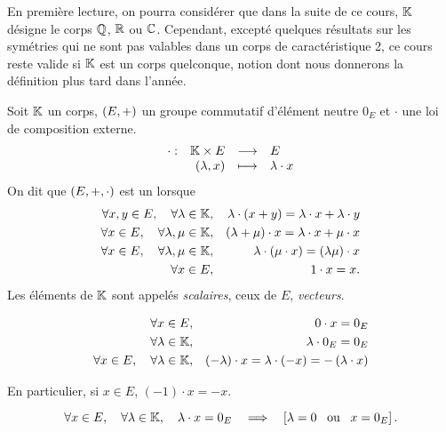 \documentclass{magnolia}
\begin{document}
En première lecture, on pourra considérer que dans la suite de ce cours, $\mathbb{K}$ désigne le corps $\mathbb{Q}$, $\mathbb{R}$ ou
$\mathbb{C}$. Cependant, excepté quelques résultats sur les symétries qui ne sont pas valables dans
un corps de caractéristique 2, ce cours reste valide si $\mathbb{K}$ est un corps quelconque, notion
dont nous donnerons la définition plus tard dans l'année.
\vspace{2ex}

\begin{definition}[utile=-3]
Soit $\mathbb{K}$ un corps, $\left(E,+\right)$ un groupe commutatif d'élément neutre $0_E$ et
$\cdot$ une loi de composition externe.
\[\begin{array}[t]{lrcl} \displaystyle{\cdot} : & \displaystyle{\ensuremath{\mathbb{K}}\times E} & \longrightarrow & \displaystyle{E} \\ & \displaystyle{\left(\lambda,x\right)} & \longmapsto & \displaystyle{\lambda\cdot x} \end{array}\]
On dit que $\left(E,+,\cdot\right)$ est un \emph{\Kev} lorsque
\begin{eqnarray*}
\forall x,y\in E ,\quad \forall \lambda\in\mathbb{K}, & &
  \lambda\cdot\left(x+y\right)=\lambda\cdot x+\lambda\cdot y\\
\forall x\in E ,\quad \forall \lambda,\mu\in\mathbb{K}, & &
  \left(\lambda+\mu\right)\cdot x=\lambda\cdot x+\mu\cdot x\\
\forall x\in E ,\quad \forall \lambda,\mu\in\mathbb{K}, & &
  \lambda\cdot\left(\mu\cdot x\right)=\left(\lambda\mu\right)\cdot x\\
\forall x\in E, & & 1\cdot x=x.
\end{eqnarray*}
Les éléments de $\mathbb{K}$ sont appelés \emph{scalaires}, ceux de $E$, \emph{vecteurs}.
\end{definition}

\begin{proposition}[utile=-3]
\begin{eqnarray*}
\forall x\in E,& & 0\cdot x=0_E\\
\forall \lambda\in\mathbb{K}, & & \lambda\cdot 0_E=0_E\\
\forall x\in E ,\quad \forall \lambda\in\mathbb{K}, & &
  \left(-\lambda\right)\cdot x=\lambda\cdot\left(-x\right)=-\left(\lambda\cdot x\right)
\end{eqnarray*}
\end{proposition}

\begin{remarqueUnique}
\remarque[utile=-1] En particulier, si $x\in E$, $(-1)\cdot x=-x$.
\end{remarqueUnique}

\begin{proposition}[utile=1]
\[\forall x\in E ,\quad \forall \lambda\in\mathbb{K} ,\quad
  \lambda\cdot x=0_E \quad\Longrightarrow\quad \left[\lambda=0 \quad\!\text{ou}\quad\! x=0_E\right].\]  
\end{proposition}
\end{document}
